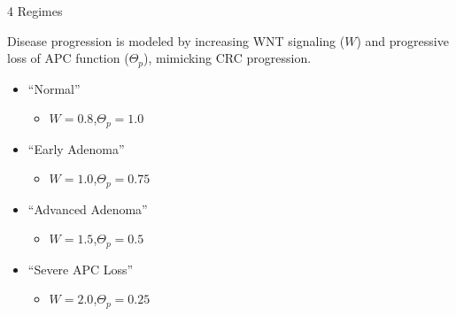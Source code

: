 \documentclass[aspectratio=169,11pt]{beamer}
\begin{document}
\begin{frame}{4 Regimes}
  \cornermarkbr
  \vspace{0.12cm}
  {\fontsize{12.5}{17}\selectfont\color{Snow}%
   Disease progression is modeled by increasing WNT signaling ($W$) and
   progressive loss of APC function ($\Theta_p$), mimicking CRC progression.\par}
  \vspace{0.40cm}
  \hspace{0.35cm}%
  \begin{minipage}{0.66\textwidth}
    \begin{itemize}\setlength\itemsep{0.14cm}
      \item ``Normal''
        \begin{itemize}\item $W=\mathbf{0.8}$,\quad $\Theta_p=\mathbf{1.0}$\end{itemize}
      \item ``Early Adenoma''
        \begin{itemize}\item $W=\mathbf{1.0}$,\quad $\Theta_p=\mathbf{0.75}$\end{itemize}
      \item ``Advanced Adenoma''
        \begin{itemize}\item $W=\mathbf{1.5}$,\quad $\Theta_p=\mathbf{0.5}$\end{itemize}
      \item ``Severe APC Loss''
        \begin{itemize}\item $W=\mathbf{2.0}$,\quad $\Theta_p=\mathbf{0.25}$\end{itemize}
    \end{itemize}
  \end{minipage}
\end{frame}

\begin{frame}[plain]
  \cornermark
  \vspace{0.30cm}
  \centering
\end{frame}

\begin{frame}[plain]
  \cornermark
  \vspace{0.24cm}
  \centering
\end{frame}
\end{document}

